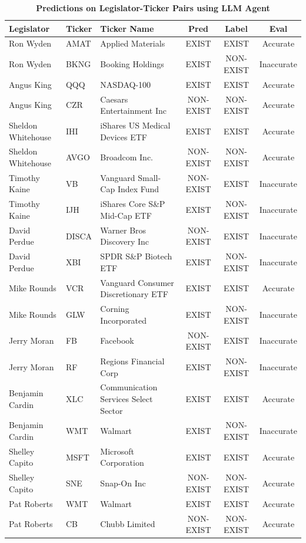 \documentclass[15pt,letterpaper]{article}
\begin{document}

\begin{table}[h]
  \centering
  \caption{\textbf{Predictions on Legislator-Ticker Pairs using LLM Agent}}
  \begin{tabular}{|l|l|l|c|c|c|}
  \hline
  \textbf{Legislator} & \textbf{Ticker} & \textbf{Ticker Name} & \textbf{Pred} & \textbf{Label} & \textbf{Eval} \\
  \hline
  Ron Wyden & AMAT & Applied Materials & EXIST & EXIST & Accurate \\
  Ron Wyden & BKNG & Booking Holdings & EXIST & NON-EXIST & Inaccurate \\
  Angus King & QQQ & NASDAQ-100 & EXIST & EXIST & Accurate \\
  Angus King & CZR & Caesars Entertainment Inc & NON-EXIST & NON-EXIST & Accurate \\
  Sheldon Whitehouse & IHI & iShares US Medical Devices ETF & EXIST & EXIST & Accurate \\
  Sheldon Whitehouse & AVGO & Broadcom Inc. & NON-EXIST & NON-EXIST & Accurate \\
  Timothy Kaine & VB & Vanguard Small-Cap Index Fund & NON-EXIST & EXIST & Inaccurate \\
  Timothy Kaine & IJH & iShares Core S\&P Mid-Cap ETF & EXIST & NON-EXIST & Inaccurate \\
  David Perdue & DISCA & Warner Bros Discovery Inc & NON-EXIST & EXIST & Inaccurate \\
  David Perdue & XBI & SPDR S\&P Biotech ETF & EXIST & NON-EXIST & Inaccurate \\
  Mike Rounds & VCR & Vanguard Consumer Discretionary ETF & EXIST & EXIST & Accurate \\
  Mike Rounds & GLW & Corning Incorporated & EXIST & NON-EXIST & Inaccurate \\
  Jerry Moran & FB & Facebook & NON-EXIST & EXIST & Inaccurate \\
  Jerry Moran & RF & Regions Financial Corp & EXIST & NON-EXIST & Inaccurate \\
  Benjamin Cardin & XLC & Communication Services Select Sector & EXIST & EXIST & Accurate \\
  Benjamin Cardin & WMT & Walmart & EXIST & NON-EXIST & Inaccurate \\
  Shelley Capito & MSFT & Microsoft Corporation & EXIST & EXIST & Accurate \\
  Shelley Capito & SNE & Snap-On Inc & NON-EXIST & NON-EXIST & Accurate \\
  Pat Roberts & WMT & Walmart & EXIST & EXIST & Accurate \\
  Pat Roberts & CB & Chubb Limited & NON-EXIST & NON-EXIST & Accurate \\
  \hline
  \end{tabular}
  \label{tab:prediction_analysis}
  \end{table}
\end{document}
